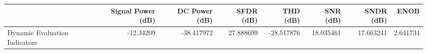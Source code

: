 \begin{tabular}{lrrrrrrr}
\toprule
{} &  Signal Power (dB) &  DC Power (dB) &  SFDR (dB) &   THD (dB) &   SNR (dB) &  SNDR (dB) &      ENOB \\
\midrule
Dynamic Evaluation Indicators &          -12.34209 &     -38.417972 &  27.888699 & -28.517876 &  18.035461 &  17.663241 &  2.641734 \\
\bottomrule
\end{tabular}
